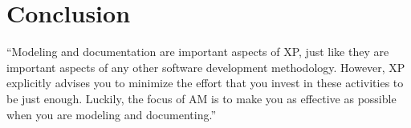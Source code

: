 \section{Conclusion}
\enquote{Modeling and documentation are important aspects of XP, just like they
are important aspects of any other software development methodology. However, XP
explicitly advises you to minimize the effort that you invest in these
activities to be just enough. Luckily, the focus of AM is to make you as
effective as possible when you are modeling and documenting.}\cite{Ambler200204}